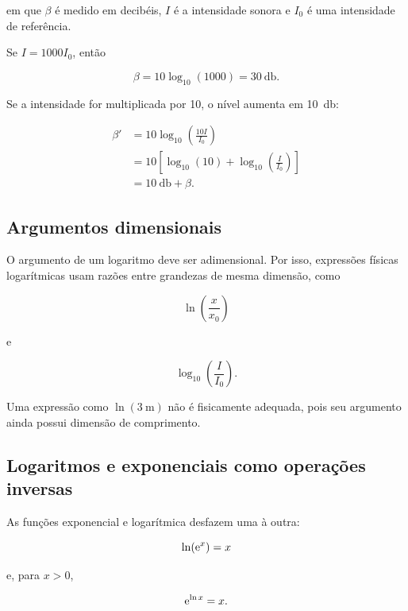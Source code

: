 em que $\beta$ é medido em decibéis, $I$ é a intensidade sonora e $I_0$ é uma intensidade de referência.

Se $I=1000I_0$, então

\begin{equation}
  \beta=10\log_{10}(1000)=\SI{30}{\decibel}.
\end{equation}

Se a intensidade for multiplicada por 10, o nível aumenta em \SI{10}{\decibel}:

\begin{align}
  \beta'
  &=10\log_{10}\left(\frac{10I}{I_0}\right)\\
  &=10\left[\log_{10}(10)+\log_{10}\left(\frac{I}{I_0}\right)\right]\\
  &=\SI{10}{\decibel}+\beta.
\end{align}

\subsection{Argumentos dimensionais}

O argumento de um logaritmo deve ser adimensional. Por isso, expressões físicas logarítmicas usam razões entre grandezas de mesma dimensão, como

\begin{equation}
  \ln\left(\frac{x}{x_0}\right)
\end{equation}

e

\begin{equation}
  \log_{10}\left(\frac{I}{I_0}\right).
\end{equation}

Uma expressão como $\ln(\SI{3}{\meter})$ não é fisicamente adequada, pois seu argumento ainda possui dimensão de comprimento.

\subsection{Logaritmos e exponenciais como operações inversas}

As funções exponencial e logarítmica desfazem uma à outra:

\begin{equation}
  \ln(\mathrm{e}^x)=x
\end{equation}

e, para $x>0$,

\begin{equation}
  \mathrm{e}^{\ln x}=x.
\end{equation}

